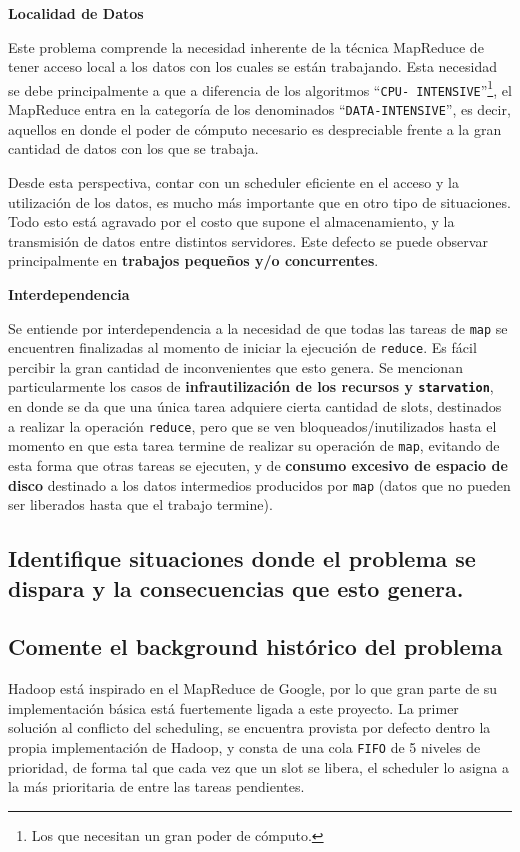 \documentclass[11pt, a4paper, twoside]{article}
\begin{document}
\begin{center}
\textbf{Localidad de Datos}
\end{center}
Este problema comprende la necesidad inherente de la técnica MapReduce de tener
acceso local a los datos con los cuales se están trabajando. Esta necesidad se
debe principalmente a que a diferencia de los algoritmos ``\texttt{CPU-
INTENSIVE}''\footnote{Los que necesitan un gran poder de cómputo.}, el MapReduce
entra en la categoría de los denominados ``\texttt{DATA-INTENSIVE}'', es decir,
aquellos en donde el poder de cómputo necesario es despreciable frente a la gran
cantidad de datos con los que se trabaja.

Desde esta perspectiva, contar con un scheduler eficiente en el acceso y la
utilización de los datos, es mucho más importante que en otro tipo de
situaciones. Todo esto está agravado por el costo que supone el almacenamiento,
y la transmisión de datos entre distintos servidores. Este defecto se puede
observar principalmente en \textbf{trabajos pequeños y/o concurrentes}.


\begin{center}
\textbf{Interdependencia}
\end{center}
Se entiende por interdependencia a la necesidad de que todas las tareas de
\texttt{map} se encuentren finalizadas al momento de iniciar la ejecución de
\texttt{reduce}. Es fácil percibir la gran cantidad de inconvenientes que esto
genera. Se mencionan particularmente los casos de \textbf{infrautilización de
los recursos y \texttt{starvation}}, en donde se da que una única tarea adquiere
cierta cantidad de slots, destinados a realizar la operación \texttt{reduce},
pero que se ven bloqueados/inutilizados hasta el momento en que esta tarea
termine de realizar su operación de \texttt{map}, evitando de esta forma que
otras tareas se ejecuten, y de \textbf{consumo excesivo de espacio de disco}
destinado a los datos intermedios producidos por \texttt{map} (datos que no
pueden ser liberados hasta que el trabajo termine).

\clearpage
\subsection {\footnotesize Identifique situaciones donde el problema se dispara y la consecuencias que esto genera.}
\label{investigacion-3}

\clearpage
\subsection {\footnotesize Comente el background histórico del problema}
\label{investigacion-4}
Hadoop está inspirado en el MapReduce de Google, por lo que gran parte de su
implementación básica está fuertemente ligada a este proyecto. La primer
solución al conflicto del scheduling, se encuentra provista por defecto dentro
la propia implementación de Hadoop, y consta de una cola \texttt{FIFO} de 5
niveles de prioridad, de forma tal que cada vez que un slot se libera, el
scheduler lo asigna a la más prioritaria de entre las tareas pendientes.
\end{document}
